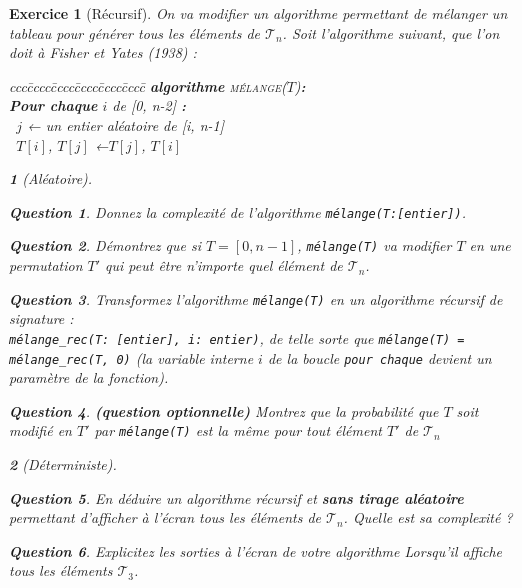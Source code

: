 \documentclass{article}
\theoremstyle{exostyle}
\newtheorem{exo}{Exercice}
\theoremstyle{partiestyle}
\newtheorem{partie}{}[exo]
\theoremstyle{questionstyle}
\newtheorem{questionpartie}{Question}[partie]
\begin{document}
\begin{exo}[Récursif]
    On va modifier un algorithme permettant de mélanger un tableau pour générer tous les éléments de $\mathcal{T}_n$. Soit l'algorithme suivant, que l'on doit à Fisher et Yates (1938) :
        \begin{tabbing}
            ccc\=cccc\=cccc\=cccc\=cccc\=cccc\=\kill
            \textbf{algorithme} \textsc{mélange}($T$){\bf :}\\
            \>\textbf{Pour chaque} $i$ de [0, n-2] {\bf :}\\
            \> \>\vline $\,$ $j$ ← un entier aléatoire de [i, n-1] \\
            \> \>\vline $\,$ $T[i]$, $T[j]$ ←$T[j]$, $T[i]$
        \end{tabbing}

    \begin{partie}[Aléatoire]
        \begin{questionpartie}
            Donnez la complexité de l'algorithme \verb|mélange(T:[entier])|.
        \end{questionpartie}
        \begin{questionpartie}
            Démontrez que si $T=[0, n-1]$, \verb|mélange(T)| va modifier $T$ en une permutation $T'$ qui peut être n'importe quel élément de $\mathcal{T}_n$.
        \end{questionpartie}
        \begin{questionpartie}
            Transformez l'algorithme \verb|mélange(T)| en un algorithme récursif de signature :\\ \verb|mélange_rec(T: [entier], i: entier)|, de telle sorte que \verb|mélange(T) = mélange_rec(T, 0)| (la variable interne $i$ de la boucle \verb|pour chaque| devient un paramètre de la fonction). 
        \end{questionpartie}
        \begin{questionpartie}
        {\em\bf (question optionnelle)} Montrez que la probabilité que $T$ soit modifié en $T'$ par \verb|mélange(T)| est la même pour tout élément $T'$ de $\mathcal{T}_n$
        \end{questionpartie}

        \end{partie}
        \begin{partie}[Déterministe]
        \begin{questionpartie}
            En déduire un algorithme récursif et {\bf sans tirage aléatoire} permettant d'afficher à l'écran tous les éléments de $\mathcal{T}_n$. Quelle est sa complexité ?
        \end{questionpartie}
        \begin{questionpartie}
            Explicitez les sorties à l'écran de votre algorithme Lorsqu'il affiche tous les éléments $\mathcal{T}_3$.
        \end{questionpartie}

    \end{partie}
\end{exo}
\end{document}
